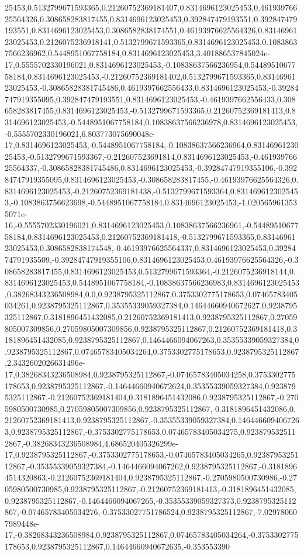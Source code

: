 25453,0.5132799671593365,0.21260752369181407,0.8314696123025453,0.46193976625564326,0.308658283817455,0.8314696123025453,0.392847479193551,0.392847479193551,0.8314696123025453,0.3086582838174551,0.46193976625564326,0.8314696123025453,0.2126075236918141,0.5132799671593365,0.8314696123025453,0.10838637566236962,0.5448951067758184,0.8314696123025453,3.401886537845024e-17,0.5555702330196021,0.8314696123025453,-0.10838637566236954,0.5448951067758184,0.8314696123025453,-0.21260752369181402,0.5132799671593365,0.8314696123025453,-0.30865828381745486,0.4619397662556433,0.8314696123025453,-0.39284747919355095,0.392847479193551,0.8314696123025453,-0.4619397662556433,0.308658283817455,0.8314696123025453,-0.5132799671593365,0.21260752369181413,0.8314696123025453,-0.5448951067758184,0.10838637566236978,0.8314696123025453,-0.5555702330196021,6.803773075690048e-17,0.8314696123025453,-0.5448951067758184,-0.10838637566236964,0.8314696123025453,-0.5132799671593367,-0.212607523691814,0.8314696123025453,-0.46193976625564337,-0.30865828381745486,0.8314696123025453,-0.39284747919355106,-0.39284747919355095,0.8314696123025453,-0.308658283817455,-0.46193976625564326,0.8314696123025453,-0.21260752369181438,-0.5132799671593364,0.8314696123025453,-0.1083863756623698,-0.5448951067758184,0.8314696123025453,-1.0205659613535071e-16,-0.5555702330196021,0.8314696123025453,0.10838637566236961,-0.5448951067758184,0.8314696123025453,0.21260752369181418,-0.5132799671593365,0.8314696123025453,0.3086582838174548,-0.46193976625564337,0.8314696123025453,0.3928474791935509,-0.39284747919355106,0.8314696123025453,0.46193976625564326,-0.308658283817455,0.8314696123025453,0.5132799671593364,-0.2126075236918144,0.8314696123025453,0.5448951067758184,-0.10838637566236983,0.8314696123025453,0.38268343236508984,0.0,0.9238795325112867,0.3753302775178653,0.07465783405034261,0.9238795325112867,0.35355339059327384,0.14644660940672627,0.9238795325112867,0.3181896451432085,0.21260752369181413,0.9238795325112867,0.27059805007309856,0.27059805007309856,0.9238795325112867,0.21260752369181418,0.3181896451432085,0.9238795325112867,0.1464466094067263,0.35355339059327384,0.9238795325112867,0.07465783405034264,0.3753302775178653,0.9238795325112867,2.3432602026631496e-17,0.38268343236508984,0.9238795325112867,-0.07465783405034258,0.3753302775178653,0.9238795325112867,-0.14644660940672624,0.35355339059327384,0.9238795325112867,-0.21260752369181404,0.3181896451432086,0.9238795325112867,-0.2705980500730985,0.27059805007309856,0.9238795325112867,-0.3181896451432086,0.21260752369181413,0.9238795325112867,-0.35355339059327384,0.1464466094067263,0.9238795325112867,-0.3753302775178653,0.07465783405034275,0.9238795325112867,-0.38268343236508984,4.686520405326299e-17,0.9238795325112867,-0.3753302775178653,-0.07465783405034265,0.9238795325112867,-0.35355339059327384,-0.1464466094067262,0.9238795325112867,-0.31818964514320863,-0.21260752369181404,0.9238795325112867,-0.2705980500730986,-0.2705980500730985,0.9238795325112867,-0.21260752369181413,-0.3181896451432085,0.9238795325112867,-0.1464466094067265,-0.35355339059327373,0.9238795325112867,-0.07465783405034276,-0.37533027751786524,0.9238795325112867,-7.029780607989448e-17,-0.38268343236508984,0.9238795325112867,0.07465783405034264,-0.3753302775178653,0.9238795325112867,0.14644660940672635,-0.353553390